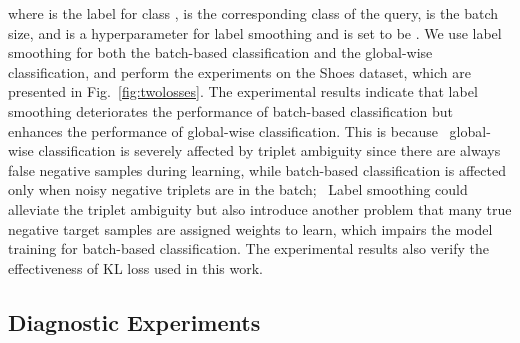 \documentclass[sigconf]{acmart}
\begin{document}
where  is the label for class ,  is the corresponding class of the query,  is the batch size, and  is a hyperparameter for label smoothing and is set to be . We use label smoothing for both the batch-based classification and the global-wise classification, and perform the experiments on the Shoes dataset, which are presented in Fig.~\ref{fig:twolosses}. The experimental results indicate that label smoothing deteriorates the performance of batch-based classification but enhances the performance of global-wise classification. This is because ~global-wise classification is severely affected by triplet ambiguity since there are always false negative samples during learning, while batch-based classification is affected only when noisy negative triplets are in the batch; ~Label smoothing could alleviate the triplet ambiguity but also introduce another problem that many true negative target samples are assigned weights to learn, which impairs the model training for batch-based classification. The experimental results also verify the effectiveness of KL loss used in this work.


\subsection{Diagnostic Experiments}
\label{subsec:diagnostic}


\begin{table}[t]
\caption{Comparison of various pyramid training methods on the Shoes dataset, which are trained and evaluated independently.}
\label{tab:pyramid}
\setlength\tabcolsep{20pt}
\end{table}
\end{document}
